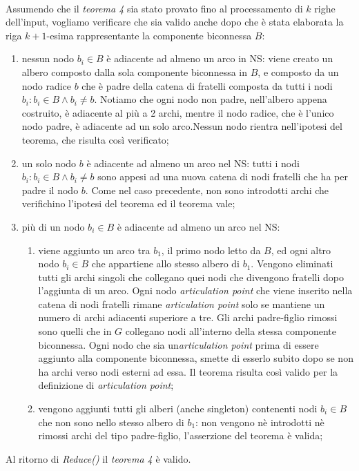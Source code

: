 \documentclass[a4paper,11pt]{report}
\begin{document}
\paragraph{}
Assumendo che il \emph{teorema 4} sia stato provato fino al processamento di $k$ righe dell'input, vogliamo verificare che sia valido anche
dopo che è stata elaborata la riga $k+1$-esima 
rappresentante la componente biconnessa $B$:
\begin{enumerate}
 \item nessun nodo $b_i\in B$ è adiacente ad almeno un arco in NS: viene creato un albero composto dalla sola componente biconnessa in $B$,
e composto da un nodo radice $b$ che
è padre della catena di fratelli composta da tutti i nodi $b_i:b_i\in B\wedge b_i \neq b$. Notiamo che ogni nodo non padre, nell'albero
appena costruito, è adiacente al più a 2 archi,
mentre il nodo radice, che è l'unico nodo padre, è adiacente ad un solo arco.Nessun nodo rientra nell'ipotesi del teorema, che risulta così
verificato;
 \item un solo nodo $b$ è adiacente ad almeno un arco nel NS: tutti i nodi $b_i:b_i\in B\wedge b_i\neq b$ sono appesi ad una nuova catena di
nodi fratelli che ha per padre il nodo $b$.
Come nel caso precedente, non sono introdotti archi che verifichino l'ipotesi del teorema ed il teorema vale;
 \item più di un nodo $b_i\in B$ è adiacente ad almeno un arco nel NS:
  \begin{enumerate}
   \item viene aggiunto un arco tra $b_1$, il primo nodo letto da $B$, ed ogni altro nodo $b_i\in B$ che appartiene allo stesso albero di
$b_1$. Vengono eliminati tutti gli archi singoli
che collegano quei nodi che divengono fratelli dopo l'aggiunta di un arco. Ogni nodo \emph{articulation point} che viene inserito nella
catena di nodi fratelli rimane \emph{articulation point}
solo se mantiene un numero di archi adiacenti superiore a tre. Gli archi padre-figlio rimossi sono quelli che in $G$ collegano nodi
all'interno della stessa componente biconnessa.
Ogni nodo che sia un\emph{articulation point} prima di essere aggiunto alla componente biconnessa, smette di esserlo subito dopo se non ha
archi verso nodi esterni ad essa. Il teorema risulta
così valido per la definizione di \emph{articulation point};
  \item vengono aggiunti tutti gli alberi (anche singleton) contenenti nodi $b_i\in B$ che non sono nello stesso albero di $b_1$: non
vengono nè introdotti nè rimossi archi del tipo padre-figlio, 
l'asserzione del teorema è valida;
  \end{enumerate}
\end{enumerate}
Al ritorno di \emph{Reduce()} il \emph{teorema 4} è valido.
\end{document}
